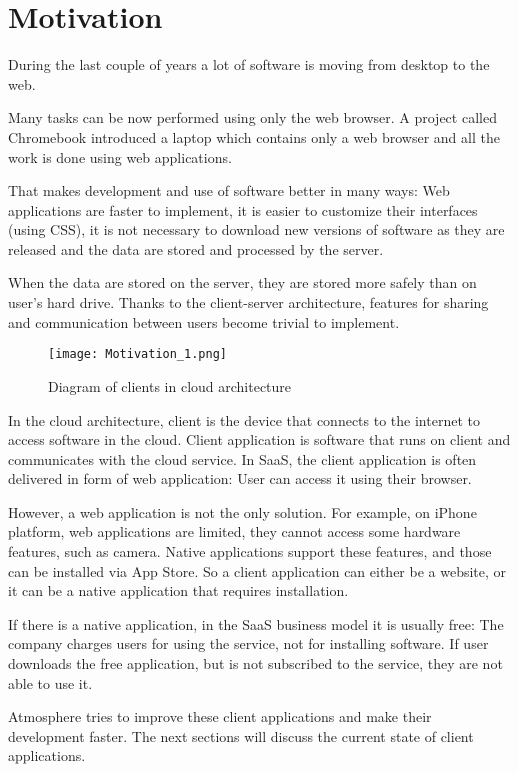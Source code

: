 \section{Motivation}

During the last couple of years a lot of software is moving from desktop to the web.

Many tasks can be now performed using only the web browser. A project called Chromebook \citep{chromebook} introduced a laptop which contains only a web browser and all the work is done using web applications.

That makes development and use of software better in many ways: Web applications are faster to implement, it is easier to customize their interfaces (using CSS), it is not necessary to download new versions of software as they are released and the data are stored and processed by the server.

When the data are stored on the server, they are stored more safely than on user's hard drive. Thanks to the client-server architecture, features for sharing and communication between users become trivial to implement.

\begin{figure}[ht!]
\centering
\texttt{[image: Motivation\_1.png]}
\caption{Diagram of clients in cloud architecture \label{fig:1}}
\end{figure}

In the cloud architecture, client is the device that connects to the internet to access software in the cloud. Client application is software that runs on client and communicates with the cloud service. In SaaS, the client application is often delivered in form of web application: User can access it using their browser.

However, a web application is not the only solution. For example, on iPhone platform, web applications are limited, they cannot access some hardware features, such as camera. Native applications support these features, and those can be installed via App Store. So a client application can either be a website, or it can be a native application that requires installation.

If there is a native application, in the SaaS business model it is usually free: The company charges users for using the service, not for installing software. If user downloads the free application, but is not subscribed to the service, they are not able to use it.

Atmosphere tries to improve these client applications and make their development faster. The next sections will discuss the current state of client applications.

